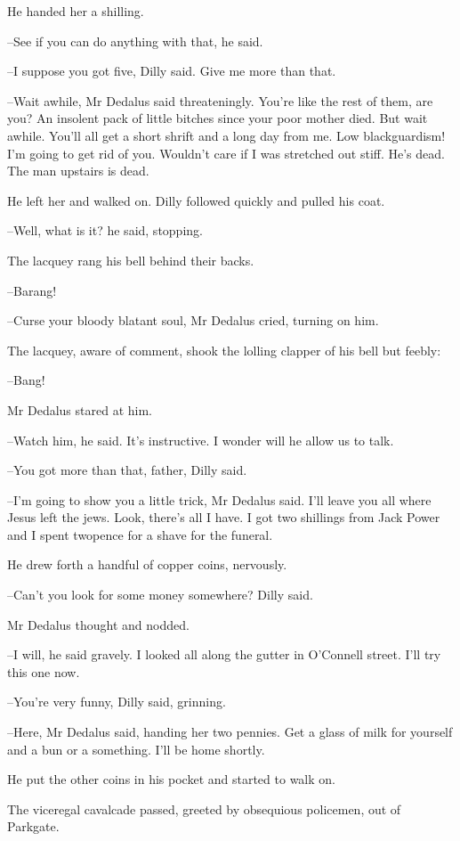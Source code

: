 He handed her a shilling.

--See if you can do anything with that,
he said.

--I suppose you got five,
Dilly said.
Give me more than that.

--Wait awhile,
Mr Dedalus said threateningly.
You're like the rest of
them, are you?
An insolent pack of little bitches since your poor mother
died.
But wait awhile.
You'll all get a short shrift and a long day from
me.
Low blackguardism!
I'm going to get rid of you.
Wouldn't care if I
was stretched out stiff.
He's dead.
The man upstairs is dead.

He left her and walked on.
Dilly followed quickly and pulled his coat.

--Well, what is it?
he said, stopping.

The lacquey rang his bell behind their backs.

--Barang!

--Curse your bloody blatant soul,
Mr Dedalus cried,
turning on him.

The lacquey,
aware of comment,
shook the lolling clapper of his bell
but feebly:

--Bang!

Mr Dedalus stared at him.

--Watch him,
he said.
It's instructive.
I wonder will he allow us to talk.

--You got more than that, father,
Dilly said.

--I'm going to show you a little trick,
Mr Dedalus said.
I'll leave you
all where Jesus left the jews.
Look, there's all I have.
I got two
shillings from Jack Power
and I spent twopence for a shave for the
funeral.

He drew forth a handful of copper coins,
nervously.

--Can't you look for some money somewhere?
Dilly said.

Mr Dedalus thought and nodded.

--I will,
he said gravely.
I looked all along the gutter in O'Connell
street.
I'll try this one now.

--You're very funny,
Dilly said, grinning.

--Here,
Mr Dedalus said,
handing her two pennies.
Get a glass of milk for
yourself
and a bun or a something.
I'll be home shortly.

He put the other coins in his pocket and started to walk on.

The viceregal cavalcade passed,
greeted by obsequious policemen,
out of Parkgate.%

